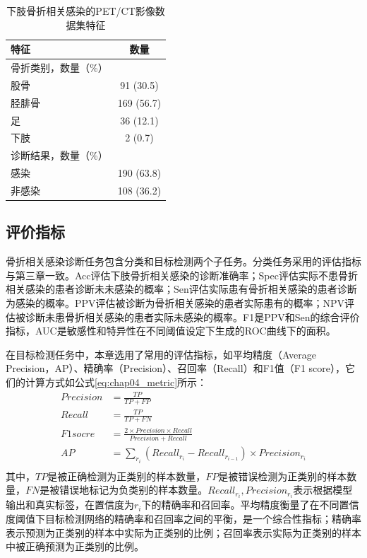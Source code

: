 \begin{table}[htbp]
  \centering
  \caption{下肢骨折相关感染的PET/CT影像数据集特征}
  \begin{tabular}{lc}
    \toprule
    特征         & 数量       \\
    \midrule
    骨折类别，数量（\%）      \\
    \quad 股骨   & 91 (30.5)  \\
    \quad 胫腓骨 & 169 (56.7) \\
    \quad 足     & 36 (12.1)  \\
    \quad 下肢   & 2 (0.7)    \\
    诊断结果，数量（\%）      \\
    \quad 感染   & 190 (63.8) \\
    \quad 非感染 & 108 (36.2) \\
    \bottomrule
  \end{tabular}
  \label{tab:chap04_dataset}
\end{table}

\subsection{评价指标}

骨折相关感染诊断任务包含分类和目标检测两个子任务。分类任务采用的评估指标与第三章一致。Acc评估下肢骨折相关感染的诊断准确率；Spec评估实际不患骨折相关感染的患者诊断未未感染的概率；Sen评估实际患有骨折相关感染的患者诊断为感染的概率。PPV评估被诊断为骨折相关感染的患者实际患有的概率；NPV评估被诊断未患骨折相关感染的患者实际未感染的概率。F1是PPV和Sen的综合评价指标，AUC是敏感性和特异性在不同阈值设定下生成的ROC曲线下的面积。

在目标检测任务中，本章选用了常用的评估指标，如平均精度（Average Precision，AP）、精确率（Precision）、召回率（Recall）和F1值（F1 score），它们的计算方式如公式\ref{eq:chap04_metric}所示：
\begin{equation}
  \begin{aligned}
    Precision & = \frac{TP}{TP+FP}                                                   \\
    Recall    & = \frac{TP}{TP+FN}                                                   \\
    F1 socre  & = \frac{2 \times Precision \times Recall}{Precision + Recall}        \\
    AP        & = \sum_{r_i}(Recall_{r_i} - Recall_{r_{i-1}}) \times Precision_{r_i} \\
  \end{aligned}
  \label{eq:chap04_metric}
\end{equation}
其中，\(TP\)是被正确检测为正类别的样本数量，\(FP\)是被错误检测为正类别的样本数量，\(FN\)是被错误地标记为负类别的样本数量。\(Recall_{r_i}, Precision_{r_i}\)表示根据模型输出和真实标签，在置信度为\(r_i\)下的精确率和召回率。平均精度衡量了在不同置信度阈值下目标检测网络的精确率和召回率之间的平衡，是一个综合性指标；精确率表示预测为正类别的样本中实际为正类别的比例；召回率表示实际为正类别的样本中被正确预测为正类别的比例。

